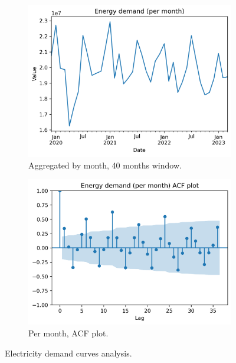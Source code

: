 \begin{figure}[H]\ContinuedFloat
    \begin{subfigure}{.43\textwidth}
        \centering
        \includegraphics[width=1\linewidth]{images/variable_analysis/esios_demand_m_40}
        \caption{Aggregated by month, 40 months window.}
    \end{subfigure}
    \begin{subfigure}{.45\textwidth}
        \centering
        \includegraphics[width=1\linewidth]{images/variable_analysis/esios_demand_m_acf}
        \caption{Per month, ACF plot.}
    \end{subfigure}

    \caption{Electricity demand curves analysis.}
    \label{fig:demand-series}
\end{figure}

